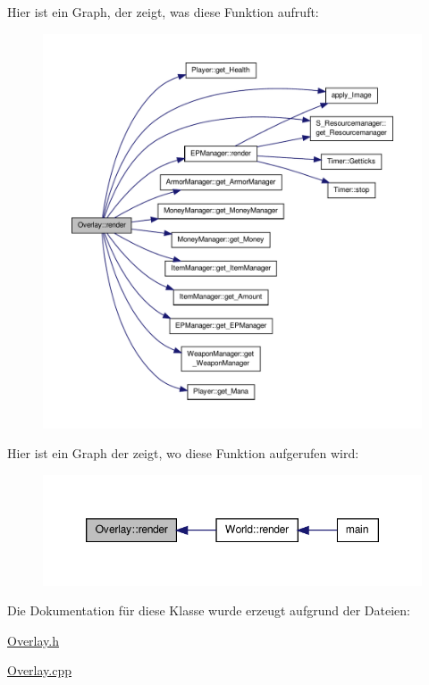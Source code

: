 Hier ist ein Graph, der zeigt, was diese Funktion aufruft\-:
\nopagebreak
\begin{figure}[H]
\begin{center}
\leavevmode
\includegraphics[width=350pt]{class_overlay_ab5e47eefa2743c08bc208131c8b17a45_cgraph}
\end{center}
\end{figure}




Hier ist ein Graph der zeigt, wo diese Funktion aufgerufen wird\-:
\nopagebreak
\begin{figure}[H]
\begin{center}
\leavevmode
\includegraphics[width=350pt]{class_overlay_ab5e47eefa2743c08bc208131c8b17a45_icgraph}
\end{center}
\end{figure}




Die Dokumentation für diese Klasse wurde erzeugt aufgrund der Dateien\-:\begin{DoxyCompactItemize}
\item 
\hyperlink{_overlay_8h}{Overlay.\-h}\item 
\hyperlink{_overlay_8cpp}{Overlay.\-cpp}\end{DoxyCompactItemize}
